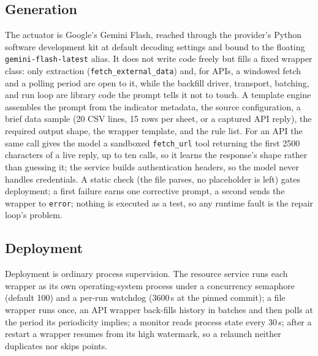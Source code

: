\documentclass[conference]{IEEEtran}
\begin{document}
\subsection{Generation}
\label{sec:gen}
The actuator is Google's Gemini Flash, reached through the provider's Python
software development kit at default decoding settings and bound to the floating \texttt{gemini-flash-latest}
alias. It does not write code freely but fills a fixed wrapper class: only extraction
(\texttt{fetch\_external\_data}) and, for APIs, a windowed fetch and a polling period
are open to it, while the backfill driver, transport, batching, and run loop are
library code the prompt tells it not to touch. A template engine assembles the prompt from the indicator metadata, the source
configuration, a brief data sample (20 CSV lines, 15 rows per sheet, or a captured
API reply), the required output shape, the wrapper template, and the rule list. For an API the same call gives the model a sandboxed \texttt{fetch\_url} tool
returning the first 2500 characters of a live reply, up to ten calls, so it learns the
response's shape rather than guessing it; the service builds authentication headers,
so the model never handles credentials. A static check (the file parses, no
placeholder is left) gates deployment; a first failure earns one corrective prompt, a
second sends the wrapper to \texttt{error}; nothing is executed as a test, so any
runtime fault is the repair loop's problem.

\subsection{Deployment}
\label{sec:deploy}
Deployment is ordinary process supervision. The resource service runs each wrapper
as its own operating-system process under a concurrency semaphore (default 100) and a
per-run watchdog (3600\,s at the pinned commit); a file wrapper runs once, an API
wrapper
back-fills history in batches and then polls at the period its periodicity implies;
a monitor reads process state every 30\,s; after a restart a wrapper resumes from
its high watermark, so a relaunch neither duplicates nor skips points.
\end{document}
